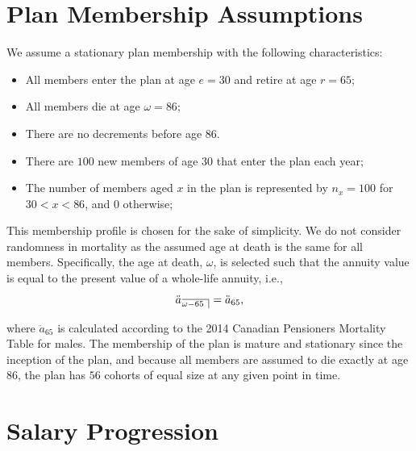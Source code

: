 \documentclass{sfuthesis}
\numberwithin{equation}{chapter}
\begin{document}
	
	\section{Plan Membership Assumptions}
	\label{Plan Membership Assumptions}
		
		\justify
		We assume a stationary plan membership with the following characteristics:
		
		\begin{itemize}
			\item All members enter the plan at age $e=30$ and retire at age $r=65$;
			\item All members die at age $\omega = 86$;
			\item There are no decrements before age 86.
			\item There are $100$ new members of age 30 that enter the plan each year;
			\item The number of members aged $x$ in the plan is represented by $n_{x} = 100$ for $30<x<86$, and $0$ otherwise;
		\end{itemize}
		
		\justify
		This membership profile is chosen for the sake of simplicity. We do not consider randomness in mortality as the assumed age at death is the same for all members. Specifically, the age at death, $\omega$, is selected such that the annuity value is equal to the present value of a whole-life annuity, i.e.,
		\begin{equation}
		\label{eq:STBP_1}
		\ddot{a}_{\angl{\omega-65}} = \ddot{a}_{65},
		\end{equation}
		
		\justify
		where $\ddot{a}_{65}$ is calculated according to the 2014 Canadian Pensioners Mortality Table for males. The membership of the plan is mature and stationary since the inception of the plan, and because all members are assumed to die exactly at age $86$, the plan has $56$ cohorts of equal size at any given point in time.
	
	
	\section{Salary Progression}
	\label{Salary Progression}
	
\end{document}
